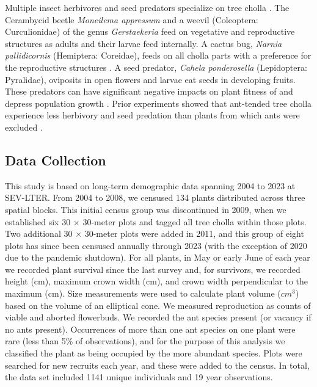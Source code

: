 \documentclass[11pt]{article}
\begin{document}
Multiple insect herbivores and seed predators specialize on tree cholla \citep{Mann1969}. 
The Cerambycid beetle \textit{Moneilema appressum} and a weevil (Coleoptera: Curculionidae) of the genus \textit{Gerstaekeria} feed on vegetative and reproductive structures as adults and their larvae feed internally. 
A cactus bug, \textit{Narnia pallidicornis} (Hemiptera: Coreidae), feeds on all cholla parts with a preference for the reproductive structures \citep{Miller2006}.
A seed predator, \textit{Cahela ponderosella} (Lepidoptera: Pyralidae), oviposits in open flowers and larvae eat seeds in developing fruits. 
These predators can have significant negative impacts on plant fitness of and depress population growth \citep{Miller2009}.
Prior experiments showed that ant-tended tree cholla experience less herbivory and seed predation than plants from which ants were excluded \citep{Miller2007,Ohm2014}. 

\subsection*{Data Collection}
This study is based on long-term demographic data spanning 2004 to 2023 at SEV-LTER. 
From 2004 to 2008, we censused 134 plants distributed across three spatial blocks. 
This initial census group was discontinued in 2009, when we established six 30 $\times$ 30-meter plots and tagged all tree cholla within those plots. 
Two additional 30 $\times$ 30-meter plots were added in 2011, and this group of eight plots has since been censused annually through 2023 (with the exception of 2020 due to the pandemic shutdown). 
For all plants, in May or early June of each year we recorded plant survival since the last survey and, for survivors, we recorded height (cm), maximum crown width (cm), and crown width perpendicular to the maximum (cm).
Size measurements were used to calculate plant volume ($cm^3$) based on the volume of an elliptical cone. 
We measured reproduction as counts of viable and aborted flowerbuds. 
We recorded the ant species present (or vacancy if no ants present).
Occurrences of more than one ant species on one plant were rare (less than 5\% of observations), and for the purpose of this analysis we classified the plant as being occupied by the more abundant species. 
Plots were searched for new recruits each year, and these were added to the census.
In total, the data set included 1141 unique individuals and 19 year observations. 
\end{document}
